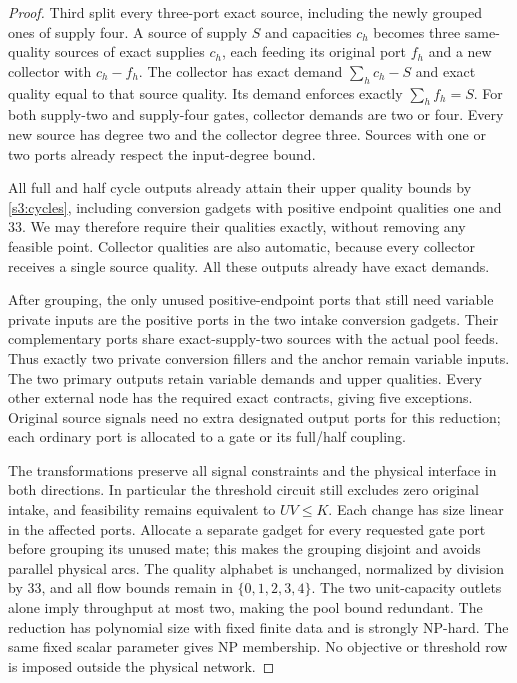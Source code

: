 \begin{proof}
Third split every three-port exact source, including the newly grouped
ones of supply four. A source of supply $S$ and capacities $c_h$ becomes
three same-quality sources of exact supplies $c_h$, each feeding its
original port $f_h$ and a new collector with $c_h-f_h$. The collector
has exact demand $\sum_hc_h-S$ and exact quality equal to that source
quality. Its demand enforces exactly $\sum_hf_h=S$. For both supply-two
and supply-four gates, collector demands are two or four. Every new
source has degree two and the collector degree three. Sources with one
or two ports already respect the input-degree bound.

All full and half cycle outputs already attain their upper quality
bounds by \cref{s3:cycles}, including conversion gadgets with positive
endpoint qualities one and 33. We may therefore require their qualities
exactly, without removing any feasible point. Collector qualities are
also automatic, because every collector receives a single source
quality. All these outputs already have exact demands.

After grouping, the only unused positive-endpoint ports that still
need variable private inputs are the positive ports in the two intake
conversion gadgets. Their complementary ports share exact-supply-two
sources with the actual pool feeds. Thus exactly two private conversion
fillers and the anchor remain variable inputs. The two primary outputs
retain variable demands and upper qualities. Every other external node
has the required exact contracts, giving five exceptions. Original source
signals need no extra designated output ports for this reduction; each
ordinary port is allocated to a gate or its full/half coupling.

The transformations preserve all signal constraints and the physical
interface in both directions. In particular the threshold circuit still
excludes zero original intake, and feasibility remains equivalent to
$UV\le K$. Each change has size linear in the affected ports. Allocate a separate
gadget for every requested gate port before grouping its unused mate;
this makes the grouping disjoint and avoids parallel physical arcs. The
quality alphabet is unchanged, normalized by division by 33, and all
flow bounds remain in $\{0,1,2,3,4\}$. The two unit-capacity outlets
alone imply throughput at most two, making the pool bound redundant.
The reduction has polynomial size with fixed finite data and is strongly
NP-hard. The same fixed scalar parameter gives NP membership. No
objective or threshold row is imposed outside the physical network.
\end{proof}

